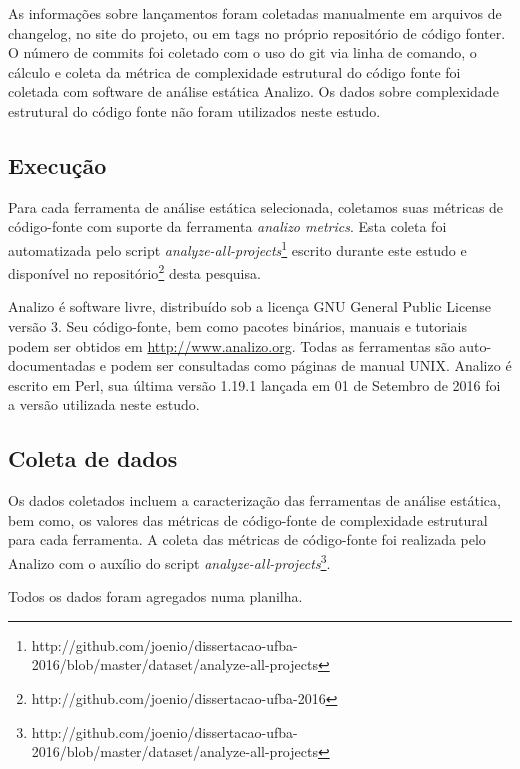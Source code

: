 As informações sobre lançamentos foram coletadas manualmente em arquivos de
changelog, no site do projeto, ou em tags no próprio repositório de código
fonter. O número de commits foi coletado com o uso do git via linha de comando,
o cálculo e coleta da métrica de complexidade estrutural do código fonte foi
coletada com software de análise estática Analizo.
Os dados sobre complexidade estrutural do código fonte não foram utilizados
neste estudo.

\subsection{Execução}

Para cada ferramenta de análise estática selecionada, coletamos  suas métricas de código-fonte
com suporte da ferramenta {\it analizo metrics}. 
Esta coleta foi automatizada pelo script {\it
analyze-all-projects}\footnote{http://github.com/joenio/dissertacao-ufba-2016/blob/master/dataset/analyze-all-projects}
escrito durante este estudo e  disponível no
repositório\footnote{http://github.com/joenio/dissertacao-ufba-2016} desta
pesquisa.

Analizo é software livre, distribuído sob a licença GNU General Public License
versão 3. Seu código-fonte, bem como pacotes binários, manuais e tutoriais
podem ser obtidos em \url{http://www.analizo.org}. Todas as ferramentas são
auto-documentadas e podem ser consultadas como páginas de manual UNIX. 
Analizo é escrito em Perl, sua última versão 1.19.1 lançada em 01 de Setembro de 2016
foi a versão utilizada neste estudo.

\subsection{Coleta de dados} \label{analise}

Os dados coletados incluem a caracterização das ferramentas de análise
estática, bem como, os valores das métricas de código-fonte de complexidade
estrutural para cada ferramenta. A coleta das métricas de
código-fonte foi realizada pelo Analizo com o auxílio do script {\em
analyze-all-projects}\footnote{http://github.com/joenio/dissertacao-ufba-2016/blob/master/dataset/analyze-all-projects}. 

Todos os dados foram agregados numa planilha.

